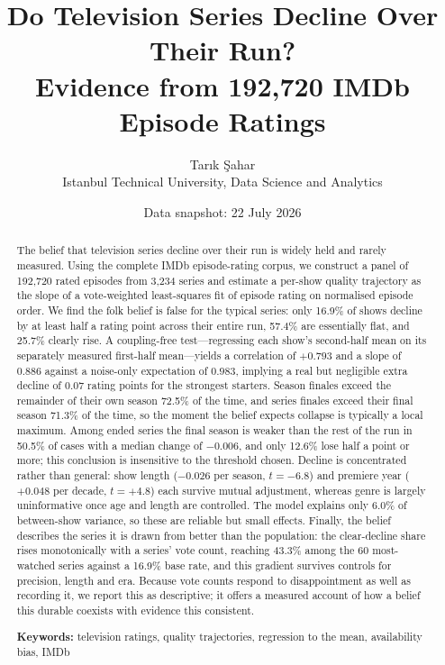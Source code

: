 \documentclass[11pt,a4paper]{article}
\title{\bfseries Do Television Series Decline Over Their Run?\\[0.3em]
\large Evidence from 192{,}720 IMDb Episode Ratings}
\author{Tar\i k \c{S}ahar\\[0.2em]
\small Istanbul Technical University, Data Science and Analytics}
\date{Data snapshot: 22 July 2026}
\begin{document}
\maketitle

\begin{abstract}
\noindent
The belief that television series decline over their run is widely held and
rarely measured. Using the complete IMDb episode-rating corpus, we construct a
panel of 192,720 rated episodes from 3,234 series and estimate a per-show
quality trajectory as the slope of a vote-weighted least-squares fit of episode
rating on normalised episode order. We find the folk belief is false for the
typical series: only 16.9\% of shows decline by at least half a rating point
across their entire run, 57.4\% are essentially flat, and 25.7\% clearly rise.
A coupling-free test---regressing each show's second-half mean on its
separately measured first-half mean---yields a correlation of $+0.793$ and a
slope of $0.886$ against a noise-only expectation of $0.983$, implying a real
but negligible extra decline of 0.07 rating points for the strongest starters.
Season finales exceed the remainder of their own season 72.5\% of the time, and
series finales exceed their final season 71.3\% of the time, so the moment the
belief expects collapse is typically a local maximum. Among ended series the
final season is weaker than the rest of the run in 50.5\% of cases with a
median change of $-0.006$, and only 12.6\% lose half a point or more; this
conclusion is insensitive to the threshold chosen. Decline is concentrated
rather than general: show length ($-0.026$ per season, $t=-6.8$) and premiere
year ($+0.048$ per decade, $t=+4.8$) each survive mutual adjustment, whereas
genre is largely uninformative once age and length are controlled. The model
explains only 6.0\% of between-show variance, so these are reliable but small
effects. Finally, the belief describes the series it is drawn from better than
the population: the clear-decline share rises monotonically with a series' vote
count, reaching 43.3\% among the 60 most-watched series against a 16.9\% base
rate, and this gradient survives controls for precision, length and era. Because
vote counts respond to disappointment as well as recording it, we report this as
descriptive; it offers a measured account of how a belief this durable coexists
with evidence this consistent.

\medskip
\noindent\textbf{Keywords:} television ratings, quality trajectories,
regression to the mean, availability bias, IMDb
\end{abstract}
\end{document}

